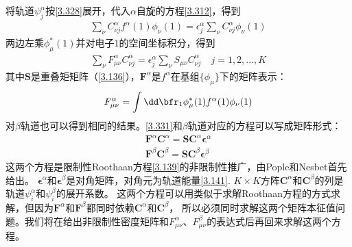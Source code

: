 将轨道$\psi^\alpha_j$按\autoref{3.328}展开，代入$\alpha$自旋的\hft 方程\autoref{3.312}，得到
\begin{align}
	\sum_\nu C^\alpha_{\nu j}f^\alpha(1)\phi_\nu(1)=\epsilon^\alpha_j\sum_\nu C^\alpha_{\nu j}\phi_\nu(1)
\end{align}
两边左乘$\phi_\mu^*(1)$并对电子1的空间坐标积分，得到
\begin{align}
	\sum_\nu F^\alpha_{\mu\nu}C^\alpha_{\nu j} = \epsilon^\alpha_j\sum_\nu S_{\mu\nu}C^\alpha_{\nu j} \quad j=1,2,\ldots,K
\end{align}
其中$\mathbf{S}$是重叠矩矩阵（\autoref{3.136}），$\mathbf{F}^\alpha$是$f^\alpha$在基组$\{\phi_\mu\}$下的矩阵表示：
\begin{align}
	F^\alpha_{\mu\nu}=\int{\dd\bfr_1}\phi^*_\mu(1)f^\alpha(1)\phi_\nu(1)
\end{align}
对$\beta$轨道也可以得到相同的结果。\autoref{3.331}和$\beta$轨道对应的方程可以写成矩阵形式：
\begin{align}
	\mathbf{F}^\alpha\mathbf{C}^\alpha = \mathbf{S}\mathbf{C}^\alpha\bm{\epsilon}^\alpha\\
	\mathbf{F}^\beta\mathbf{C}^\beta = \mathbf{S}\mathbf{C}^\beta\bm{\epsilon}^\beta
\end{align}
这两个方程是限制性Roothaan方程\autoref{3.139}的非限制性推广，由Pople和Nesbet首先给出。
$\bm{\epsilon}^\alpha$和$\bm{\epsilon}^\beta$是对角矩阵，对角元为轨道能量\autoref{3.141}. 
$K\times K$方阵$\mathbf{C}^\alpha$和$\mathbf{C}^\beta$的列是轨道$\psi_i^\alpha$和$\psi_i^\beta$的展开系数。
这两个方程可以用类似于求解Roothaan方程的方式求解，但因为$\mathbf{F}^\alpha$和$\mathbf{F}^\beta$都同时依赖$\mathbf{C}^\alpha$和$\mathbf{C}^\beta$，
所以必须同时求解这两个矩阵本征值问题。我们将在给出非限制性密度矩阵和$F^\alpha_{\mu\nu}$、$F^\beta_{\mu\nu}$的表达式后再回来求解这两个方程。
